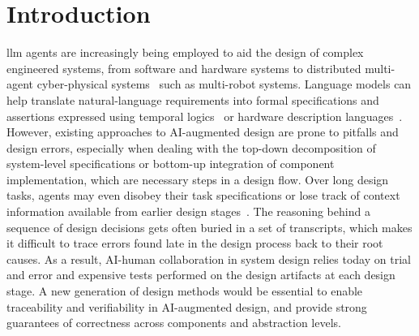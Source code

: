\section{Introduction}

\Gls{llm} agents are increasingly being employed to aid the design of complex engineered systems, from software and hardware systems to distributed multi-agent cyber-physical systems~\cite{xiao2026memocode} such as 
multi-robot systems. Language models can help translate natural-language requirements into formal specifications and assertions expressed using temporal logics~\cite{cosler2023nl2spec} or hardware description languages~\cite{orenes2023llmfv,kang2024fveval}. However, existing approaches to AI-augmented design are prone to pitfalls and design errors, especially when dealing with the top-down  decomposition of system-level specifications or bottom-up integration of component implementation, which are necessary steps in a design flow. Over long design tasks, agents may even disobey their task specifications or lose track of context information available from earlier design stages~\cite{cemri2025mast}. The reasoning behind a sequence of design decisions gets often buried in a set of transcripts, which makes it difficult to trace errors found late in the design process back to their root causes. As a result, AI-human collaboration in system design relies today on trial and error and expensive tests performed on the design artifacts at each design stage. A new generation of design methods would be essential to enable traceability and verifiability in AI-augmented design, and provide strong guarantees of correctness across components and abstraction levels.

